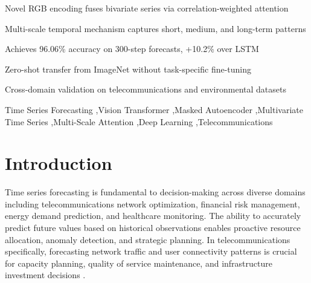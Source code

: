 \documentclass[preprint,12pt,authoryear]{elsarticle}
\begin{document}
\begin{frontmatter}

\begin{highlights}
\item Novel RGB encoding fuses bivariate series via correlation-weighted attention
\item Multi-scale temporal mechanism captures short, medium, and long-term patterns
\item Achieves 96.06\% accuracy on 300-step forecasts, +10.2\% over LSTM
\item Zero-shot transfer from ImageNet without task-specific fine-tuning
\item Cross-domain validation on telecommunications and environmental datasets
\end{highlights}

\begin{keyword}
Time Series Forecasting \sep Vision Transformer \sep Masked Autoencoder \sep Multivariate Time Series \sep Multi-Scale Attention \sep Deep Learning \sep Telecommunications
\end{keyword}

\end{frontmatter}


\section{Introduction}
\label{sec:introduction}

Time series forecasting is fundamental to decision-making across diverse domains including telecommunications network optimization, financial risk management, energy demand prediction, and healthcare monitoring. The ability to accurately predict future values based on historical observations enables proactive resource allocation, anomaly detection, and strategic planning. In telecommunications specifically, forecasting network traffic and user connectivity patterns is crucial for capacity planning, quality of service maintenance, and infrastructure investment decisions \citep{lim2021}.
\end{document}
